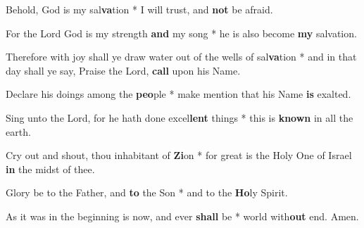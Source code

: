 \begin{multicols}{2}
	Behold, God is my sal\textbf{va}tion * I will trust, and \textbf{not} be afraid.
	
	For the Lord God is my strength \textbf{and} my song * he is also become \textbf{my} salvation.
	
	Therefore with joy shall ye draw water out of the wells of sal\textbf{va}tion * and in that day shall ye say, Praise the Lord, \textbf{call} upon his Name.
	
	Declare his doings among the \textbf{peo}ple * make mention that his Name \textbf{is} exalted.
	
	Sing unto the Lord, for he hath done excel\textbf{lent} things * this is \textbf{known} in all the earth.
	
	Cry out and shout, thou inhabitant of \textbf{Zi}on * for great is the Holy One of Israel \textbf{in} the midst of thee.
	
	Glory be to the Father, and \textbf{to} the Son * and to the \textbf{Ho}ly Spirit.
	
	As it was in the beginning is now, and ever \textbf{shall} be * world with\textbf{out} end. Amen.
\end{multicols}